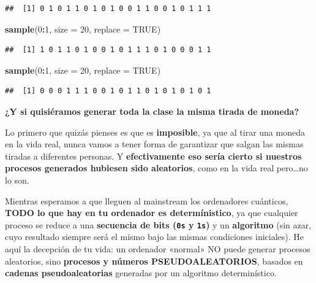 \documentclass[11pt,]{book}
\newenvironment{Shaded}{\begin{snugshade}}{\end{snugshade}}
\newcommand{\DataTypeTok}[1]{\textcolor[rgb]{0.27,0.27,0.27}{#1}}
\newcommand{\DecValTok}[1]{\textcolor[rgb]{0.06,0.06,0.06}{#1}}
\newcommand{\KeywordTok}[1]{\textcolor[rgb]{0.27,0.27,0.27}{\textbf{#1}}}
\newcommand{\NormalTok}[1]{#1}
\newcommand{\OperatorTok}[1]{\textcolor[rgb]{0.43,0.43,0.43}{\textbf{#1}}}
\newcommand{\OtherTok}[1]{\textcolor[rgb]{0.37,0.37,0.37}{#1}}
\begin{document}
\begin{verbatim}
##  [1] 0 1 0 1 1 0 1 0 1 0 0 1 1 0 0 1 0 1 1 1
\end{verbatim}

\begin{Shaded}
\begin{Highlighting}[]
\KeywordTok{sample}\NormalTok{(}\DecValTok{0}\OperatorTok{:}\DecValTok{1}\NormalTok{, }\DataTypeTok{size =} \DecValTok{20}\NormalTok{, }\DataTypeTok{replace =} \OtherTok{TRUE}\NormalTok{)}
\end{Highlighting}
\end{Shaded}

\begin{verbatim}
##  [1] 1 0 1 1 0 1 0 0 1 0 1 1 1 0 1 0 0 0 1 1
\end{verbatim}

\begin{Shaded}
\begin{Highlighting}[]
\KeywordTok{sample}\NormalTok{(}\DecValTok{0}\OperatorTok{:}\DecValTok{1}\NormalTok{, }\DataTypeTok{size =} \DecValTok{20}\NormalTok{, }\DataTypeTok{replace =} \OtherTok{TRUE}\NormalTok{)}
\end{Highlighting}
\end{Shaded}

\begin{verbatim}
##  [1] 0 0 0 1 1 1 0 0 1 0 1 1 0 1 0 1 0 1 0 1
\end{verbatim}

\textbf{¿Y si quisiéramos generar toda la clase la misma tirada de moneda?}

Lo primero que quizás pienses es que es \textbf{imposible}, ya que al tirar una moneda en la vida real, nunca vamos a tener forma de garantizar que salgan las mismas tiradas a diferentes personas. Y \textbf{efectivamente eso sería cierto si nuestros procesos generados hubiesen sido aleatorios}, como en la vida real pero\ldots{}no lo son.

Mientras esperamos a que lleguen al mainstream los ordenadores cuánticos, \textbf{TODO lo que hay en tu ordenador es determínistico}, ya que cualquier proceso se reduce a una \textbf{secuencia de bits (\texttt{0\textquotesingle{}s} y \texttt{1\textquotesingle{}s})} y un \textbf{algoritmo} (sin azar, cuyo resultado siempre será el mismo bajo las mismas condiciones iniciales). He aquí la decepción de tu vida: un ordenador «normal» NO puede generar procesos aleatorios, sino \textbf{procesos y números PSEUDOALEATORIOS}, basados en \textbf{cadenas pseudoaleatorias} generadas por un algoritmo determinístico.
\end{document}
